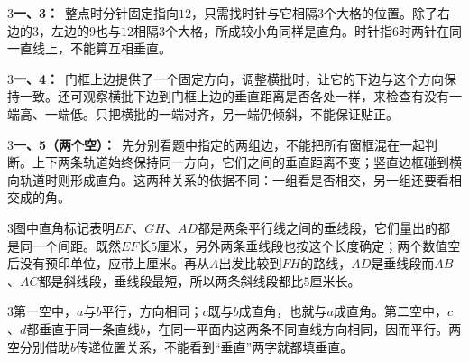 \documentclass[multi=snippet,border={5bp 20bp 5bp 5bp}]{standalone}
\newenvironment{snippet}[3]{\begin{minipage}{#1bp}\color{answerred}\fontsize{#2}{#3}\selectfont\raggedright}{\end{minipage}}
\begin{document}
\begin{snippet}{505}{11.5}{14}\begin{multicols}{3}\raggedcolumns \textbf{一、3：}\ 整点时分针固定指向\(12\)\allowbreak ，只需找时针与它相隔\(3\)\allowbreak 个大格的位置。除了右边的\(3\)\allowbreak ，左边的\(9\)\allowbreak 也与\(12\)\allowbreak 相隔\(3\)\allowbreak 个大格，所成较小角同样是直角。时针指\(6\)\allowbreak 时两针在同一直线上，不能算互相垂直。\end{multicols}\end{snippet}
\begin{snippet}{505}{11.5}{14}\begin{multicols}{3}\raggedcolumns \textbf{一、4：}\ 门框上边提供了一个固定方向，调整横批时，让它的下边与这个方向保持一致。还可观察横批下边到门框上边的垂直距离是否各处一样，来检查有没有一端高、一端低。只把横批的一端对齐，另一端仍倾斜，不能保证贴正。\end{multicols}\end{snippet}
\begin{snippet}{505}{11.5}{14}\begin{multicols}{3}\raggedcolumns \textbf{一、5（两个空）：}\ 先分别看题中指定的两组边，不能把所有窗框混在一起判断。上下两条轨道始终保持同一方向，它们之间的垂直距离不变；竖直边框碰到横向轨道时则形成直角。这两种关系的依据不同：一组看是否相交，另一组还要看相交成的角。\end{multicols}\end{snippet}
\begin{snippet}{505}{11.5}{14}\begin{multicols}{3}\raggedcolumns 图中直角标记表明\(EF\)\allowbreak 、\(GH\)\allowbreak 、\(AD\)\allowbreak 都是两条平行线之间的垂线段，它们量出的都是同一个间距。既然\(EF\)\allowbreak 长\(5\)\allowbreak 厘米，另外两条垂线段也按这个长度确定；两个数值空后没有预印单位，应带上厘米。再从\(A\)\allowbreak 出发比较到\(FH\)\allowbreak 的路线，\(AD\)\allowbreak 是垂线段而\(AB\)\allowbreak 、\(AC\)\allowbreak 都是斜线段，垂线段最短，所以两条斜线段都比\(5\)\allowbreak 厘米长。\end{multicols}\end{snippet}
\begin{snippet}{505}{11.5}{14}\begin{multicols}{3}\raggedcolumns 第一空中，\(a\)\allowbreak 与\(b\)\allowbreak 平行，方向相同；\(c\)\allowbreak 既与\(b\)\allowbreak 成直角，也就与\(a\)\allowbreak 成直角。第二空中，\(c\)\allowbreak 、\(d\)\allowbreak 都垂直于同一条直线\(b\)\allowbreak ，在同一平面内这两条不同直线方向相同，因而平行。两空分别借助\(b\)\allowbreak 传递位置关系，不能看到“垂直”两字就都填垂直。\end{multicols}\end{snippet}
\end{document}
